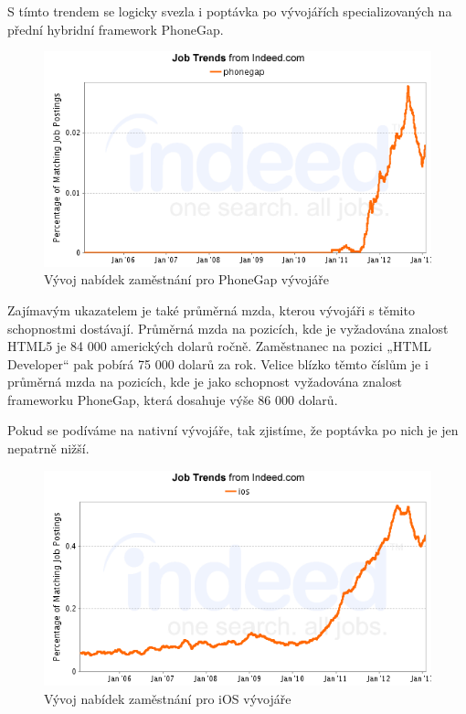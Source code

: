 S tímto trendem se logicky svezla i poptávka po vývojářích specializovaných na přední hybridní framework PhoneGap.

\begin{figure}\centering
\includegraphics[width=1.0\textwidth]{jobgraph_phonegap.png}
\caption{Vývoj nabídek zaměstnání pro PhoneGap vývojáře \cite{job_indeed}}
\label{fig:PhoneGapJobs}
\end{figure}

Zajímavým ukazatelem je také průměrná mzda, kterou vývojáři s těmito schopnostmi dostávají. Průměrná mzda na pozicích, kde je vyžadována znalost HTML5 je 84 000 amerických dolarů ročně. Zaměstnanec na pozici „HTML Developer“ pak pobírá 75 000 dolarů za rok. Velice blízko těmto číslům je i průměrná mzda na pozicích, kde je jako schopnost vyžadována znalost frameworku PhoneGap, která dosahuje výše 86 000 dolarů. \cite{job_indeed}

Pokud se podíváme na nativní vývojáře, tak zjistíme, že poptávka po nich je jen nepatrně nižší.

\begin{figure}\centering
\includegraphics[width=1.0\textwidth]{jobgraph_ios.png}
\caption{Vývoj nabídek zaměstnání pro iOS vývojáře \cite{job_indeed}}
\label{fig:iOSJobs}
\end{figure}

